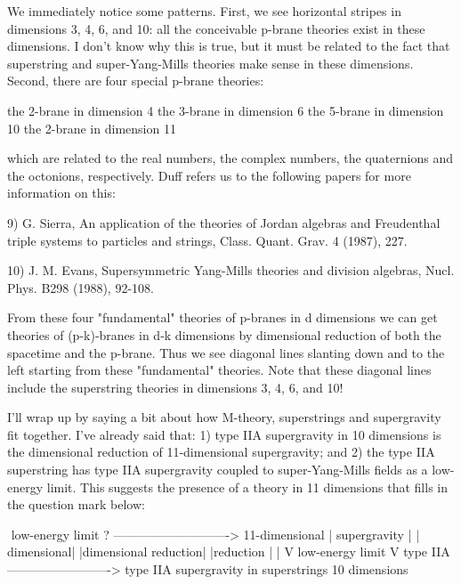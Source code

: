 We immediately notice some patterns.  First, we see horizontal stripes
in dimensions 3, 4, 6, and 10: all the conceivable p-brane theories
exist in these dimensions.  I don't know why this is true, but it must be
related to the fact that superstring and super-Yang-Mills theories make
sense in these dimensions.  Second, there are four special p-brane
theories:

the 2-brane in dimension 4
the 3-brane in dimension 6
the 5-brane in dimension 10
the 2-brane in dimension 11

which are related to the real numbers, the complex numbers, the
quaternions and the octonions, respectively.  Duff refers us to the
following papers for more information on this:

9) G. Sierra, An application of the theories of Jordan algebras and
Freudenthal triple systems to particles and strings, Class. Quant. 
Grav. 4 (1987), 227.

10) J. M. Evans, Supersymmetric Yang-Mills theories and division
algebras, Nucl. Phys. B298 (1988), 92-108.

From these four "fundamental" theories of p-branes in d dimensions we
can get theories of (p-k)-branes in d-k dimensions by dimensional
reduction of both the spacetime and the p-brane.  Thus we see diagonal
lines slanting down and to the left starting from these "fundamental"
theories.  Note that these diagonal lines include the superstring
theories in dimensions 3, 4, 6, and 10!

I'll wrap up by saying a bit about how M-theory, superstrings and
supergravity fit together.  I've already said that: 1) type IIA
supergravity in 10 dimensions is the dimensional reduction of
11-dimensional supergravity; and 2) the type IIA superstring has type
IIA supergravity coupled to super-Yang-Mills fields as a low-energy
limit.  This suggests the presence of a theory in 11 dimensions that
fills in the question mark below:

$$
                      low-energy limit
           ?  ----------------------------> 11-dimensional 
           |                                 supergravity
           |                                    |
dimensional|                                    |dimensional 
  reduction|                                    |reduction
           |                                    |
           V          low-energy limit          V
        type IIA  -------------------------> type IIA supergravity in 
      superstrings                             10 dimensions 


